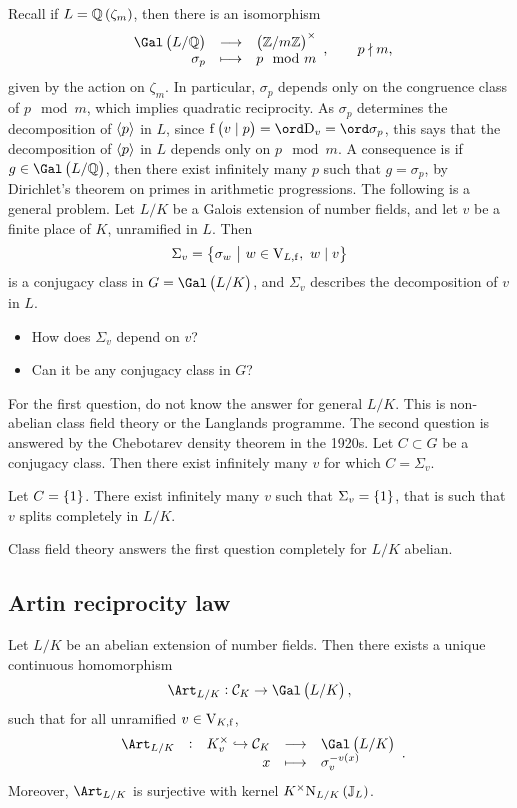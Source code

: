 
Recall if $ L = \QQ\br{\zeta_m} $, then there is an isomorphism
$$ \function{\Gal\br{L / \QQ}}{\br{\ZZ / m\ZZ}^\times}{\sigma_p}{p \mod m}, \qquad p \nmid m, $$
given by the action on $ \zeta_m $. In particular, $ \sigma_p $ depends only on the congruence class of $ p \mod m $, which implies quadratic reciprocity. As $ \sigma_p $ determines the decomposition of $ \left\langle p \right\rangle $ in $ L $, since $ \f\br{v \mid p} = \ord \D_v = \ord \sigma_p $, this says that the decomposition of $ \left\langle p \right\rangle $ in $ L $ depends only on $ p \mod m $. A consequence is if $ g \in \Gal\br{L / \QQ} $, then there exist infinitely many $ p $ such that $ g = \sigma_p $, by Dirichlet's theorem on primes in arithmetic progressions. The following is a general problem. Let $ L / K $ be a Galois extension of number fields, and let $ v $ be a finite place of $ K $, unramified in $ L $. Then
$$ \Sigma_v = \cbr{\sigma_w \st w \in \V_{L, \f}, \ w \mid v} $$
is a conjugacy class in $ G = \Gal\br{L / K} $, and $ \Sigma_v $ describes the decomposition of $ v $ in $ L $.
\begin{itemize}
\item How does $ \Sigma_v $ depend on $ v $?
\item Can it be any conjugacy class in $ G $?
\end{itemize}

For the first question, do not know the answer for general $ L / K $. This is non-abelian class field theory or the Langlands programme. The second question is answered by the Chebotarev density theorem in the 1920s. Let $ C \subset G $ be a conjugacy class. Then there exist infinitely many $ v $ for which $ C = \Sigma_v $.

\begin{example*}
Let $ C = \cbr{1} $. There exist infinitely many $ v $ such that $ \Sigma_v = \cbr{1} $, that is such that $ v $ splits completely in $ L / K $.
\end{example*}

Class field theory answers the first question completely for $ L / K $ abelian.

\subsection{Artin reciprocity law}

\begin{theorem*}
Let $ L / K $ be an abelian extension of number fields. Then there exists a unique continuous homomorphism
$$ \Art_{L / K} : \CCC_K \to \Gal\br{L / K}, $$
such that for all unramified $ v \in \mathrm{V}_{K, \mathrm{f}} $,
$$ \function[\Art_{L / K}]{K_v^\times \hookrightarrow \CCC_K}{\Gal\br{L / K}}{x}{\sigma_v^{-v\br{x}}}. $$
Moreover, $ \Art_{L / K} $ is surjective with kernel $ K^\times \N_{L / K}\br{\JJ_L} $.
\end{theorem*}

